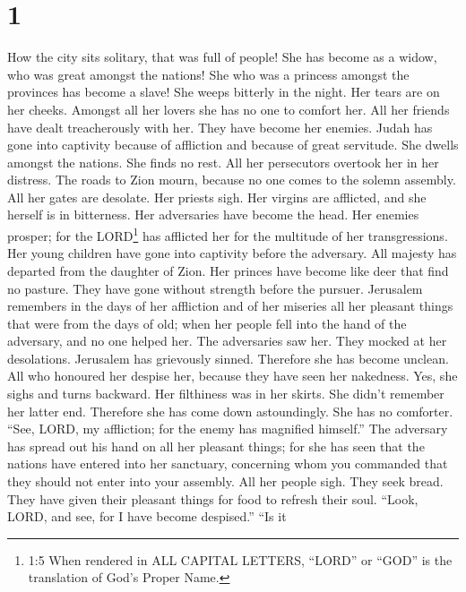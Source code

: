 \hypertarget{section}{%
\section{1}\label{section}}

 How the city sits solitary, that was full of people! She
has become as a widow, who was great amongst the nations! She who was a
princess amongst the provinces has become a slave!  She
weeps bitterly in the night. Her tears are on her cheeks. Amongst all
her lovers she has no one to comfort her. All her friends have dealt
treacherously with her. They have become her enemies.  Judah
has gone into captivity because of affliction and because of great
servitude. She dwells amongst the nations. She finds no rest. All her
persecutors overtook her in her distress.  The roads to Zion
mourn, because no one comes to the solemn assembly. All her gates are
desolate. Her priests sigh. Her virgins are afflicted, and she herself
is in bitterness.  Her adversaries have become the head. Her
enemies prosper; for the LORD\footnote{1:5 When rendered in ALL CAPITAL
  LETTERS, ``LORD'' or ``GOD'' is the translation of God's Proper Name.}
has afflicted her for the multitude of her transgressions. Her young
children have gone into captivity before the adversary.  All
majesty has departed from the daughter of Zion. Her princes have become
like deer that find no pasture. They have gone without strength before
the pursuer.  Jerusalem remembers in the days of her
affliction and of her miseries all her pleasant things that were from
the days of old; when her people fell into the hand of the adversary,
and no one helped her. The adversaries saw her. They mocked at her
desolations.  Jerusalem has grievously sinned. Therefore she
has become unclean. All who honoured her despise her, because they have
seen her nakedness. Yes, she sighs and turns backward.  Her
filthiness was in her skirts. She didn't remember her latter end.
Therefore she has come down astoundingly. She has no comforter. ``See,
LORD, my affliction; for the enemy has magnified himself.''
 The adversary has spread out his hand on all her pleasant
things; for she has seen that the nations have entered into her
sanctuary, concerning whom you commanded that they should not enter into
your assembly.  All her people sigh. They seek bread. They
have given their pleasant things for food to refresh their soul. ``Look,
LORD, and see, for I have become despised.''  ``Is it
